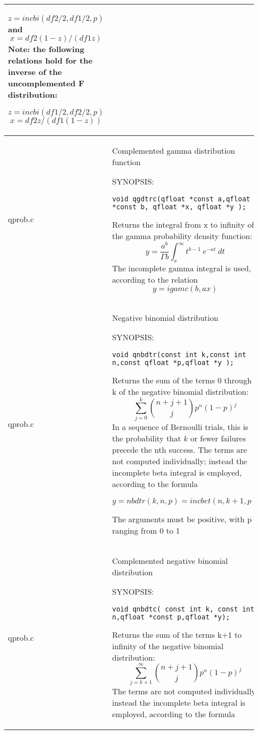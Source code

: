 \documentclass[10pt,a4paper,x11names]{memoir} %
\begin{document}
\begin{longtable}{|p{1.5cm}|p{11.5cm}|}
	$$z = incbi( df2/2, df1/2, p )$$ and
	$$x = df2 (1-z) / (df1 z)$$
	Note: the following relations hold for the inverse of
	the uncomplemented F distribution:
	
	$$z = incbi( df1/2, df2/2, p )$$
	$$x = df2 z / (df1 (1-z))$$
	\\\hline
	qprob.c& Complemented gamma distribution function
	
	{\footnotesize SYNOPSIS:}\vspace{-0.2cm}
	\begin{lstlisting}[numbers=none]
		void qgdtrc(qfloat *const a,qfloat *const b, qfloat *x, qfloat *y );
	\end{lstlisting}\vspace{-0.2cm}
	
	Returns the integral from x to infinity of the gamma
	probability density function:
	$$ y = \frac{a^b}{\Gamma b}\int_{x}^{\infty}t^{b-1}\ e^{-at}\ dt$$
	The incomplete gamma integral is used, according to the
	relation $$y = igamc( b, ax )$$
	\\\hline
	qprob.c& Negative binomial distribution
	
	{\footnotesize SYNOPSIS:}\vspace{-0.2cm}
	\begin{lstlisting}[numbers=none]
		void qnbdtr(const int k,const int n,const qfloat *p,qfloat *y );
	\end{lstlisting}\vspace{-0.2cm}
	Returns the sum of the terms 0 through k of the negative
	binomial distribution:
	$$ \sum_{j=0}^{k} \binom{n+j+1}{j} p^n (1-p)^j$$
	In a sequence of Bernoulli trials, this is the probability
	that $k$ or fewer failures precede the nth success. The terms are not computed individually; instead the incomplete
	beta integral is employed, according to the formula
	
	$$y = nbdtr( k, n, p ) = incbet( n, k+1, p )$$
	
	The arguments must be positive, with p ranging from 0 to 1
	\\\hline
	qprob.c&Complemented negative binomial distribution
	
	{\footnotesize SYNOPSIS:}\vspace{-0.2cm}
	\begin{lstlisting}[numbers=none]
		void qnbdtc( const int k, const int n,qfloat *const p,qfloat *y);
	\end{lstlisting}\vspace{-0.2cm}
	Returns the sum of the terms k+1 to infinity of the negative
	binomial distribution:
	$$ \sum_{j=k+1}^{\infty} \binom{n+j+1}{j} p^n (1-p)^j$$
	The terms are not computed individually; instead the incomplete
	beta integral is employed, according to the formula\par
	

\end{longtable}
\end{document}
